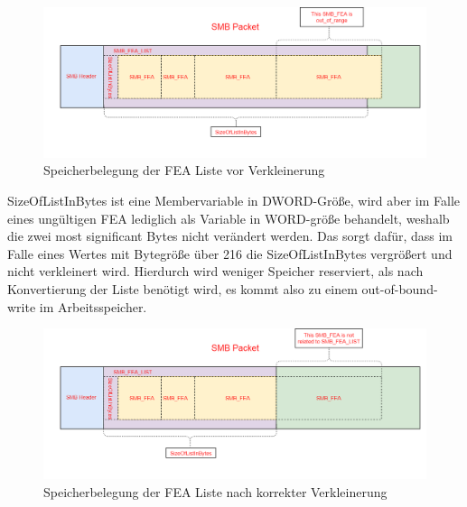 \documentclass[DIV=12,headings=normal,pdftex,headinclude=false,footinclude=false,final]{scrreprt}
\begin{document}
\begin{figure}[H]
    \centering
    \includegraphics[width=15cm]{checkpoint_before_shrink.png}
    \caption[FEAList vor Verkleinerung, Nadav Grossmann (Checkpoint Research), URL. <https://research.checkpoint.com/wp-content/uploads/2017/09/eternalblue4.png>]{Speicherbelegung der FEA Liste vor Verkleinerung}
    \label{img:fealist_before_shrinking}
\end{figure}

\noindent
SizeOfListInBytes ist eine Membervariable in DWORD-Größe, wird aber im Falle eines ungültigen FEA lediglich als Variable in WORD-größe behandelt, weshalb die zwei most significant Bytes nicht verändert werden. Das sorgt dafür, dass im Falle eines Wertes mit Bytegröße über 216 die SizeOfListInBytes vergrößert und nicht verkleinert wird. Hierdurch wird weniger Speicher reserviert, als nach Konvertierung der Liste benötigt wird, es kommt also zu einem out-of-bound-write im Arbeitsspeicher.

\begin{figure}[H]
    \centering
    \includegraphics[width=15cm]{checkpoint_after_shrink_correct.png}
    \caption[FEAList nach korrekter Verkleinerung, Nadav Grossmann (Checkpoint Research). URL: <https://research.checkpoint.com/wp-content/uploads/2017/09/eternalblue5.png>]{Speicherbelegung der FEA Liste nach korrekter Verkleinerung}
    \label{img:fealist_after_shrinking_correctly}
\end{figure}
\end{document}
